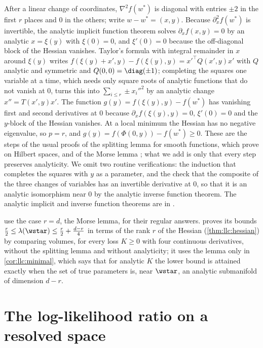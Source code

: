 \begin{refsection}
\begin{proofsketch}
After a linear change of coordinates, $\nabla^2f(w^*)$ is diagonal with entries $\pm2$ in the first $r$ places and $0$ in the others; write $w-w^*=(x,y)$. Because $\partial_x^2f(w^*)$ is invertible, the analytic implicit function theorem solves $\partial_xf(x,y)=0$ by an analytic $x=\xi(y)$ with $\xi(0)=0$, and $\xi'(0)=0$ because the off-diagonal block of the Hessian vanishes. Taylor's formula with integral remainder in $x$ around $\xi(y)$ writes $f(\xi(y)+x',y)-f(\xi(y),y)=x'^\top Q(x',y)x'$ with $Q$ analytic and symmetric and $Q(0,0)=\diag(\pm1)$; completing the squares one variable at a time, which needs only square roots of analytic functions that do not vanish at $0$, turns this into $\sum_{i\le r}\pm x_i''^2$ by an analytic change $x''=T(x',y)x'$. The function $g(y)=f(\xi(y),y)-f(w^*)$ has vanishing first and second derivatives at $0$ because $\partial_xf(\xi(y),y)=0$, $\xi'(0)=0$ and the $y$-block of the Hessian vanishes. At a local minimum the Hessian has no negative eigenvalue, so $p=r$, and $g(y)=f(\Phi(0,y))-f(w^*)\ge0$. These are the steps of the usual proofs of the splitting lemma for smooth functions, which \textcite{GromollMeyer1969} prove on Hilbert spaces, and of the Morse lemma \parencite{ArnoldEtAl1985}; what we add is only that every step preserves analyticity. We omit two routine verifications: the induction that completes the squares with $y$ as a parameter, and the check that the composite of the three changes of variables has an invertible derivative at $0$, so that it is an analytic isomorphism near $0$ by the analytic inverse function theorem. The analytic implicit and inverse function theorems are in \textcite[Chapter~2]{KrantzParks2002}.
\end{proofsketch}

 use the case $r=d$, the Morse lemma, for their regular answers.  proves its bounds $\frac r2\le\lambda(\wstar)\le\frac r2+\frac{d-r}4$ in terms of the rank $r$ of the Hessian (\cref{thm:llc:hessian}) by comparing volumes, for every loss $K\ge0$ with four continuous derivatives, without the splitting lemma and without analyticity; it uses the lemma only in \cref{cor:llc:minimal}, which says that for analytic $K$ the lower bound is attained exactly when the set of true parameters is, near $\wstar$, an analytic submanifold of dimension $d-r$.

\section{The log-likelihood ratio on a resolved space}\label{sec:toolkit:process}


\end{refsection}
